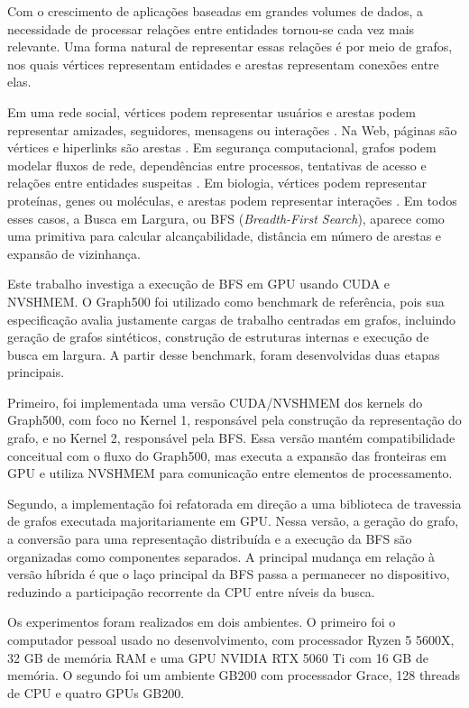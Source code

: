 Com o crescimento de aplicações baseadas em grandes volumes de dados, a
necessidade de processar relações entre entidades tornou-se cada vez mais
relevante. Uma forma natural de representar essas relações é por meio de grafos,
nos quais vértices representam entidades e arestas representam conexões entre
elas.

Em uma rede social, vértices podem representar usuários e arestas podem
representar amizades, seguidores, mensagens ou interações \cite{easleykleinberg}.
Na Web, páginas são vértices e hiperlinks são arestas \cite{brinpage}. Em
segurança computacional, grafos podem modelar fluxos de rede, dependências entre
processos, tentativas de acesso e relações entre entidades suspeitas
\cite{akoglugraphanomaly}. Em biologia, vértices podem representar proteínas,
genes ou moléculas, e arestas podem representar interações
\cite{barabasinetworkbiology}. Em todos esses casos, a Busca em Largura, ou BFS
(\textit{Breadth-First Search}), aparece como uma primitiva para calcular
alcançabilidade, distância em número de arestas e expansão de vizinhança.

Este trabalho investiga a execução de BFS em GPU usando CUDA e NVSHMEM. O
Graph500 foi utilizado como benchmark de referência, pois sua especificação
avalia justamente cargas de trabalho centradas em grafos, incluindo geração de
grafos sintéticos, construção de estruturas internas e execução de busca em
largura. A partir desse benchmark, foram desenvolvidas duas etapas principais.

Primeiro, foi implementada uma versão CUDA/NVSHMEM dos kernels do Graph500, com
foco no Kernel 1, responsável pela construção da representação do grafo, e no
Kernel 2, responsável pela BFS. Essa versão mantém compatibilidade conceitual com
o fluxo do Graph500, mas executa a expansão das fronteiras em GPU e utiliza
NVSHMEM para comunicação entre elementos de processamento.

Segundo, a implementação foi refatorada em direção a uma biblioteca de travessia
de grafos executada majoritariamente em GPU. Nessa versão, a geração do grafo, a
conversão para uma representação distribuída e a execução da BFS são organizadas
como componentes separados. A principal mudança em relação à versão híbrida é que
o laço principal da BFS passa a permanecer no dispositivo, reduzindo a
participação recorrente da CPU entre níveis da busca.

Os experimentos foram realizados em dois ambientes. O primeiro foi o computador
pessoal usado no desenvolvimento, com processador Ryzen 5 5600X, 32 GB de memória
RAM e uma GPU NVIDIA RTX 5060 Ti com 16 GB de memória. O segundo foi um ambiente
GB200 com processador Grace, 128 threads de CPU e quatro GPUs GB200.

